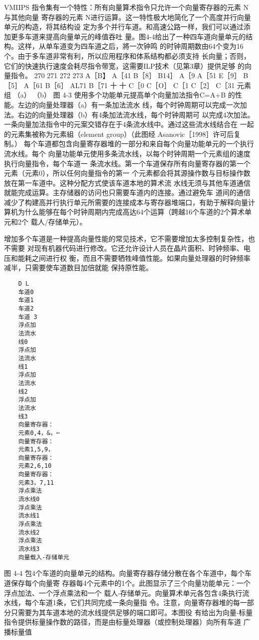 VMIIPS 指令集有一个特性：所有向量算术指令只允许一个向量寄存器的元素 N与其他向量
寄存器的元素 N进行运算。这一特性极大地简化了一个高度并行向量单元的构造，将其结构设
定为多个并行车道。和高速公路一样，我们可以通过添加更多车道来提高向量单元的峰值吞吐
量。图4-4给出了一种四车道向量单元的结构。这样，从单车道变为四车道之后，將一次钟鸣
的时钟周期数由64个变为16个。由于多车道非常有利，所以应用程序和体系结构都必须支持
长向量；否则，它们的快速执行速度会耗尽指令带宽，这需要ILP技术（见第3章）提供足够
的向量指令。
270
271
272
273
A［B】
A［41
B［8］
B14］
A［9
A［51
E［9］
B［5］
A［61
B［6］
AL71
B［71
十
十
C［0
C［O］
C［1
C［2］
C［31
元素组
（a）
（b）
图 4-3 使用多个功能单元提高单个向量加法指令C=A+B 的性能。左边的向量处理器（a）有一条加法流水
线，每个时钟周期可以完成一次加法。右边的向量处理器（b）有4条加法流水线，每个时钟周期可
以完成4次加法。一条向量加法指令中的元案交错存在于4条流水线中。通过这些流水线结合在
一起的元素集被称为元素組（element group）（此图经 Asanovic［1998］许可后复制。）
每个车道都包含向量寄存器堆的一部分和来自每个向量功能单元的一个执行流水线。每个
向量功能单元使用多条流水线，以每个时钟周期一个元素组的速度执行向量指令，每个车道一
条流水线。第一个车道保存所有向量寄存器的第一个元素（元素0），所以任何向量指令的第一
个元素都会将其源操作数与目标操作数放在第一车道中。这种分配方式使该车道本地的算术流
水线无须与其他车道通信就能完成运算。主存储器的访问也只需要车道内的连接。通过避免车
道间的通信减少了构建高并行执行单元所需要的连接成本与寄存器堆端口，有助于解释向量计
算机为什么能够在每个时钟周期内完成高达64个运算（跨越16个车道的2个算术单元和2个
载人/存储单元）。

增加多个车道是一种提高向量性能的常见技术，它不需要增加太多控制复杂性，也不需要
对现有机器代码进行修改。它还允许设计人员在晶片面积、时钟频率、电压和能耗之间进行权
衡，而且不需要牺牲峰值性能。如果向量处理器的时钟频率减半，只需要使车道数目加倍就能
保持原性能。
\begin{verbatim}
    D L
    车道0
    车道1
    车道2
    车道 3
    浮点加
    法流水
    线0
    浮点加
    法流水
    线1
    浮点加
    法流水
    线2
    浮点加
    法流水
    线3
    向量寄存器：
    元素0,4，&，⋯
    向量寄存器：
    元素1,5,9，
    向量寄存器：
    元素2,6,10
    向量寄存器：
    元素3，7,11
    浮点乘法
    流水线0
    浮点乘法
    流水线1
    浮点乘法
    流水线2
    浮点乘法
    流水线3
    向量载入-存储单元
\end{verbatim}
图 4-4
包4个车道的向量单元的结构。向量寄存器存储分散在各个车道中，每个车道保存每个向量寄
存器每4个元素中的1个。此图显示了三个向量功能单元：一个浮点加法、一个浮点乘法和一个
载人-存储单元。向量算术单元各包含4条执行流水线，每个车道1条，它们共同完成一条向量指
令。注意，向量寄存器堆的每一部分只需要为其车道本地的流水线提供足够的端口即可。本图役
有给出为向量-标量指令提供标量操作数的路径，而是由标量处理器（或控制处理器）向所有车道
广播标量值

